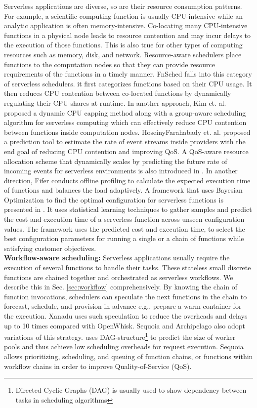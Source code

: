 Serverless applications are diverse, so are their resource consumption patterns. For example, a scientific computing function is usually CPU-intensive while an analytic application is often memory-intensive. Co-locating many CPU-intensive functions in a physical node leads to resource contention and may incur delays to the execution of those functions. This is also true for other types of computing resources such as memory, disk, and network. Resource-aware schedulers place functions to the computation nodes so that they can provide resource requirements of the functions in a timely manner. FnSched  falls into this category of serverless schedulers. it first categorizes functions based on their CPU usage. It then reduces CPU contention between co-located functions by dynamically regulating their CPU shares at runtime. In another approach, Kim et. al.  proposed a dynamic CPU capping method along with a group-aware scheduling algorithm for serverless computing which can effectively reduce CPU contention between functions inside computation nodes. HoseinyFarahabady et. al.  proposed a prediction tool to estimate the rate of event streams inside providers with the end goal of reducing CPU contention and improving QoS. A QoS-aware resource allocation scheme that dynamically scales by predicting the future rate of incoming events for serverless environments is also introduced in . In another direction, Fifer  conducts offline profiling to calculate the expected execution time of functions and balances the load adaptively. 
A framework that uses Bayesian Optimization to find the optimal configuration for serverless functions is presented in . It uses statistical learning techniques to gather samples and predict the cost and execution time of a serverless function across unseen configuration values. The framework uses the predicted cost and execution time, to select the best configuration parameters for running a single or a chain of functions while satisfying customer objectives. 
\\
\noindent \textbf{Workflow-aware scheduling:} Serverless applications usually require the execution of several functions to handle their tasks. These stateless small discrete functions are chained together and orchestrated as serverless workflows. We describe this in Sec. \ref{sec:workflow} comprehensively. By knowing the chain of function invocations, schedulers can speculate the next functions in the chain to forecast, schedule, and provision in advance e.g., prepare a warm container for the execution. Xanadu  uses such speculation to reduce the overheads and delays up to 10 times compared with OpenWhisk. Sequoia  and Archipelago  also adopt variations of this strategy.  uses DAG-structure\footnote{Directed Cyclic Graphs (DAG) is usually used to show dependency between tasks in scheduling algorithms} to predict the size of worker pools and thus achieve low scheduling overheads for request execution. Sequoia allows prioritizing, scheduling, and queuing of function chains, or functions within workflow chains in order to improve Quality-of-Service (QoS). 
